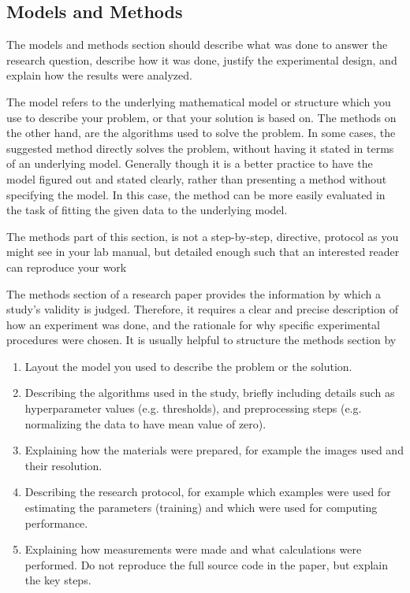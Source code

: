 \documentclass[10pt,conference,compsocconf]{IEEEtran}
\begin{document}
\subsection{Models and Methods}
The models and methods
section should describe what was
done to answer the research question, describe how it was done,
justify the experimental design, and
explain how the results were analyzed.

The model refers to the underlying mathematical model or structure which 
you use to describe your problem, or that your solution is based on. 
The methods on the other hand, are the algorithms used to solve the problem. 
In some cases, the suggested method directly solves the problem, without having it 
stated in terms of an underlying model. Generally though it is a better practice to have 
the model figured out and stated clearly, rather than presenting a method without specifying 
the model. In this case, the method can be more easily evaluated in the task of fitting 
the given data to the underlying model.

The methods part of this section, is not a step-by-step, directive,
protocol as you might see in your lab manual, but detailed enough such
that an interested reader can reproduce your
work~

The methods section of a research paper provides the information by
which a study's validity is judged.
Therefore, it requires a clear and precise description of how an
experiment was done, and the rationale
for why specific experimental procedures were chosen.
It is usually helpful to
structure the methods section by~
\begin{enumerate}
\item Layout the model you used to describe the problem or the solution.
\item Describing the algorithms used in the study, briefly including
  details such as hyperparameter values (e.g. thresholds), and
  preprocessing steps (e.g. normalizing the data to have mean value of
  zero).
\item Explaining how the materials were prepared, for example the
  images used and their resolution.
\item Describing the research protocol, for example which examples
  were used for estimating the parameters (training) and which were
  used for computing performance.
\item Explaining how measurements were made and what
  calculations were performed. Do not reproduce the full source code in
  the paper, but explain the key steps.
\end{enumerate}
\end{document}
